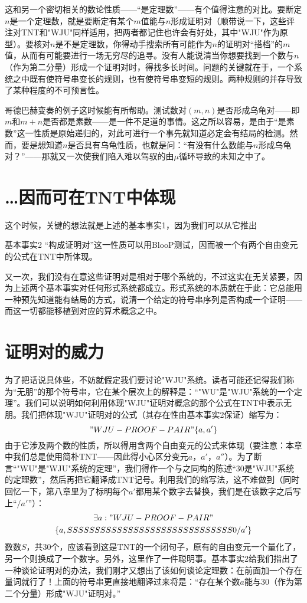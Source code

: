 这和另一个密切相关的数论性质——“是定理数”——有个值得注意的对比。要断定$n$是一个定理数，就是要断定有某个$m$值能与$n$形成证明对（顺带说一下，这些评注对TNT和"WJU"同样适用，把两者都记住也许会有好处，其中"WJU"作为原型）。要核对$n$是不是定理数，你得动手搜索所有可能作为$n$的证明对“搭档”的$m$值，从而有可能要进行一场无穷尽的追寻。没有人能说清当你想要找到一个数与$n$（作为第二分量）形成一个证明对时，得找多长时间。问题的关键就在于，一个系统之中既有使符号串变长的规则，也有使符号串变短的规则。两种规则的并存导致了某种程度的不可预言性。

哥德巴赫变奏的例子这时候能有所帮助。测试数对$(m,n)$是否形成乌龟对——即$m$和$m+n$是否都是素数——是一件不足道的事情。这之所以容易，是由于“是素数”这一性质是原始递归的，对此可进行一个事先就知道必定会有结局的检测。然而，要是想知道$n$是否具有乌龟性质，也就是问：“有没有什么数能与$n$形成乌龟对？”——那就又一次使我们陷入难以驾驭的由$\mu$循环导致的未知之中了。

\section{…因而可在TNT中体现}

这个时候，关键的想法就是上述的基本事实1，因为我们可以从它推出
\begin{thm}{基本事实2}
“构成证明对”这一性质可以用BlooP测试，因而被一个有两个自由变元的公式在TNT中所体现。
\end{thm}

又一次，我们没有在意这些证明对是相对于哪个系统的，不过这实在无关紧要，因为上述两个基本事实对任何形式系统都成立。形式系统的本质就在于此：它总能用一种预先知道能有结局的方式，说清一个给定的符号串序列是否构成一个证明——而这一切都能移植到对应的算术概念之中。

\section{证明对的威力}

为了把话说具体些，不妨就假定我们要讨论"WJU"系统。读者可能还记得我们称为“无朋”的那个符号串，它在某个层次上的解释是：“"WU"是"WJU"系统的一个定理”。我们可以说明如何利用体现"WJU"证明对概念的那个公式在TNT中表示无朋。我们把体现"WJU"证明对的公式（其存在性由基本事实2保证）缩写为：
\[
"WJU-PROOF-PAIR"\{a,a'\}
\]
由于它涉及两个数的性质，所以得用含两个自由变元的公式来体现（要注意：本章中我们总是使用简朴TNT——因此得小心区分变元$a$，$a'$，$a''$）。为了断言“"WU"是"WJU"系统的定理”，我们得作一个与之同构的陈述“$30$是"WJU"系统的定理数”，然后再把它翻译成TNT记号。利用我们的缩写法，这不难做到（同时回忆一下，第八章里为了标明每个$a'$都用某个数字去替换，我们是在该数字之后写上“$/a'$”）：
\begin{multline*}
\exists a:"WJU-PROOF-PAIR"\\
  \{a,SSSSSSSSSSSSSSSSSSSSSSSSSSSSSS0/a'\}
\end{multline*}
数数$S$，共$30$个，应该看到这是TNT的一个闭句子，原有的自由变元一个量化了，另一个则换成了一个数字。另外，这里作了一件聪明事。基本事实2给我们指出了一种谈论证明对的办法，我们刚才又想出了该如何谈论定理数：在前面加一个存在量词就行了！上面的符号串更直接地翻译过来将是：“存在某个数$a$能与$30$（作为第二个分量）形成"WJU"证明对。”

